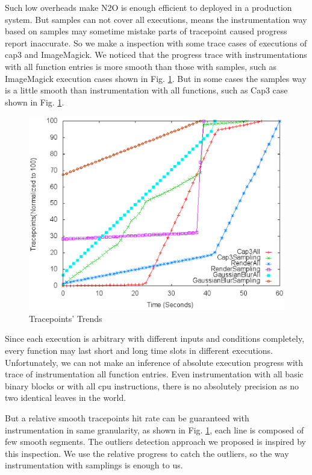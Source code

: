 Such low overheads make N2O is enough efficient to deployed in a production system. But samples can not cover all executions, means the instrumentation way based on samples may sometime mistake parts of tracepoint caused progress report inaccurate. So we make a inspection with some trace cases of executions of cap3 and ImageMagick. We noticed that the progress trace with instrumentations with all function entries is more smooth than those with samples, such as ImageMagick execution cases shown in Fig. \ref{figure:tracepoints}. But in some cases the samples way is a little smooth than instrumentation with all functions, such as Cap3 case shown in Fig. \ref{figure:tracepoints}.

\begin{figure}
\centering
\includegraphics[width=0.9\columnwidth]{figures/tracepoints_all_vs_sampling.eps}
\caption{Tracepoints' Trends}
\label{figure:tracepoints}
\end{figure}

Since each execution is arbitrary with different inputs and conditions completely, every function may last short and long time slots in different executions. Unfortunately, we can not make an inference of absolute execution progress with  trace of instrumentation all function entries. Even instrumentation with all basic binary blocks or with all cpu instructions, there is no absolutely precision as no two identical leaves in the world. 

But a relative smooth tracepoints hit rate can be guaranteed with instrumentation in same granularity, as shown in Fig.  \ref{figure:tracepoints}, each line is composed of few smooth segments. The outliers detection approach we proposed is inspired by this inspection. We use the relative progress to catch the outliers, so the way instrumentation with samplings is enough to us.

